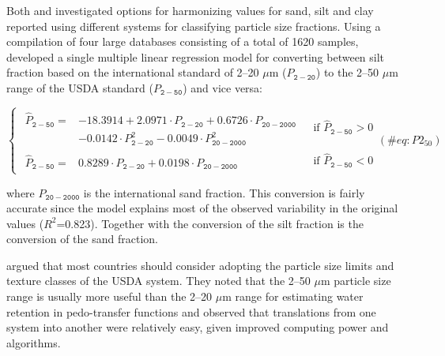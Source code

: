 \documentclass[graybox,natbib,nospthms,UStrade]{svmono}
\begin{document}
Both \citet{Nemes1999G} and \citet{Minasny2001AJSR} investigated options for
harmonizing values for sand, silt and clay reported using different
systems for classifying particle size fractions. Using a compilation of
four large databases consisting of a total of 1620 samples,
\citet{Minasny2001AJSR} developed a single multiple linear regression model for
converting between silt fraction based on the international standard of
2--20 \(\mu\)m (\(P_{\mathtt{2-20}}\)) to the 2--50 \(\mu\)m range of the USDA standard
(\(P_{\mathtt{2-50}}\)) and vice versa:

\begin{equation}
\begin{cases}
\begin{matrix} \hat P_{\mathtt{2-50}} = & -18.3914 + 2.0971 \cdot P_{\mathtt{2-20}} + 0.6726 \cdot P_{\mathtt{20-2000}}   \\
   & - 0.0142 \cdot P_{\mathtt{2-20}}^2  - 0.0049 \cdot P_{\mathtt{20-2000}}^2
\end{matrix}   & \text{ if } \hat P_{\mathtt{2-50}} > 0 \\ \begin{matrix} \hat P_{\mathtt{2-50}} = & 0.8289 \cdot P_{\mathtt{2-20}} + 0.0198 \cdot P_{\mathtt{20-2000}} \end{matrix} & \text{ if } \hat P_{\mathtt{2-50}} < 0
\end{cases}
  (\#eq:P2_50)
\end{equation}

where \(P_{\mathtt{20-2000}}\) is the international sand fraction. This
conversion is fairly accurate since the model explains most of the observed variability
in the original values (\(R^2\)=0.823). Together with the conversion of
the silt fraction is the conversion of the sand fraction.

\citet{Minasny2001AJSR} argued that most countries should consider adopting the
particle size limits and texture classes of the USDA system. They noted
that the 2--50 \(\mu\)m particle size range is usually more useful than the 2--20 \(\mu\)m range
for estimating water retention in pedo-transfer functions and observed
that translations from one system into another were relatively easy,
given improved computing power and algorithms.
\end{document}
